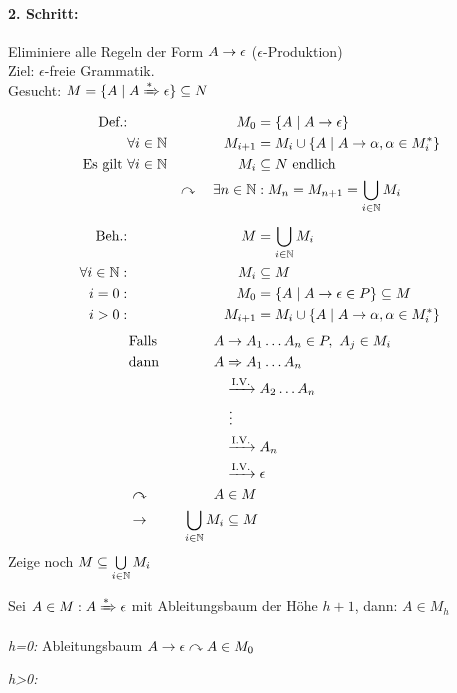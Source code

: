 \paragraph*{2. Schritt:} Eliminiere alle Regeln der Form $A\->\epsilon$ ($\epsilon$-Produktion)\\
Ziel: $\epsilon$-freie Grammatik.\\
Gesucht: $M=\{ A \mid A \xRightarrow{*}\epsilon \} \subseteq N$
\begin{alignat*}{2}
    \text{Def.:}&\quad& M_0 &= \{ A \mid A\-> \epsilon \}\\
    &\forall i\in\N& M_{i+1} &= M_i\cup \{ A \mid A\->\alpha, \alpha \in M_i^* \}\\
    \text{Es gilt }&\forall i\in\N& M_i &\subseteq N \text{ endlich}\\
    && \curvearrowright\quad \exists n\in\N &: M_n = M_{n+1} = \bigcup_{i\in\N} M_i\\[.5em]
    \text{Beh.:}&& M&=\bigcup\limits_{i\in\N} M_i\\
    \forall i\in\N :&& M_i &\subseteq M\\
    i=0 :&& \quad M_0 &= \{ A \mid A\-> \epsilon \in P \} \subseteq M\\
    i>0 :&& M_{i+1} &= M_i\cup \{ A \mid A\-> \alpha,\alpha\in M_i^* \}
\end{alignat*}
\begin{alignat*}{2}
    &\text{Falls}\quad& A &\->A_1\dots A_n\in P,\ A_j\in M_i\\
    &\text{dann} & A &\=> A_1\dots A_n\\
    &&&\xrightarrow{\text{I.V.}} A_2\dots A_n\\
    &&&\ \vdots\\
    &&&\xrightarrow{\text{I.V.}} A_n\\
    &&&\xrightarrow{\text{I.V.}} \epsilon\\
    &\curvearrowright & A &\in M\\
    &\-> & \bigcup_{i\in\N} M_i &\subseteq M
\end{alignat*}
Zeige noch $M\subseteq \bigcup\limits_{i\in\mathbb{N}} M_i$

Sei $A\in M : A\xRightarrow{*} \epsilon$ mit Ableitungsbaum der Höhe $h+1$, dann: $A\in M_h$

\emph{h=0:} Ableitungsbaum \quad {} \quad $A\->\epsilon \curvearrowright A\in M_0$

\emph{h>0:}

